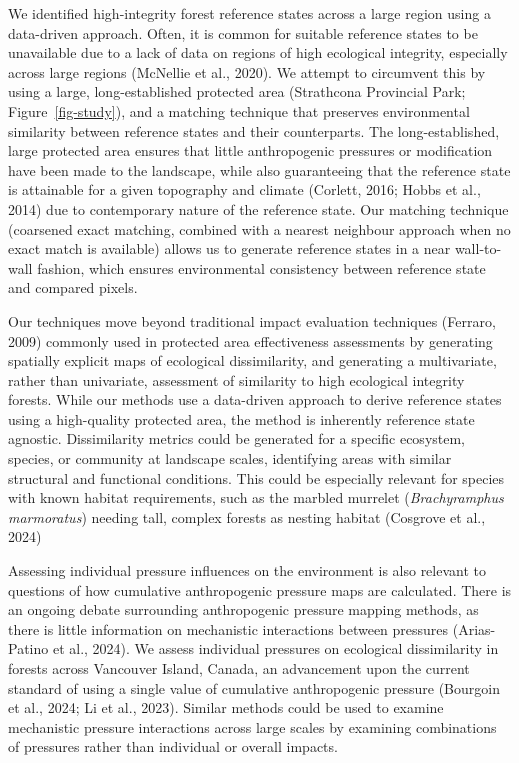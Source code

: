 \documentclass[
]{agujournal2019}
\begin{document}
We identified high-integrity forest reference states across a large
region using a data-driven approach. Often, it is common for suitable
reference states to be unavailable due to a lack of data on regions of
high ecological integrity, especially across large regions (McNellie et
al., 2020). We attempt to circumvent this by using a large,
long-established protected area (Strathcona Provincial Park;
Figure~\ref{fig-study}), and a matching technique that preserves
environmental similarity between reference states and their
counterparts. The long-established, large protected area ensures that
little anthropogenic pressures or modification have been made to the
landscape, while also guaranteeing that the reference state is
attainable for a given topography and climate (Corlett, 2016; Hobbs et
al., 2014) due to contemporary nature of the reference state. Our
matching technique (coarsened exact matching, combined with a nearest
neighbour approach when no exact match is available) allows us to
generate reference states in a near wall-to-wall fashion, which ensures
environmental consistency between reference state and compared pixels.

Our techniques move beyond traditional impact evaluation techniques
(Ferraro, 2009) commonly used in protected area effectiveness
assessments by generating spatially explicit maps of ecological
dissimilarity, and generating a multivariate, rather than univariate,
assessment of similarity to high ecological integrity forests. While our
methods use a data-driven approach to derive reference states using a
high-quality protected area, the method is inherently reference state
agnostic. Dissimilarity metrics could be generated for a specific
ecosystem, species, or community at landscape scales, identifying areas
with similar structural and functional conditions. This could be
especially relevant for species with known habitat requirements, such as
the marbled murrelet (\emph{Brachyramphus marmoratus}) needing tall,
complex forests as nesting habitat (Cosgrove et al., 2024)

Assessing individual pressure influences on the environment is also
relevant to questions of how cumulative anthropogenic pressure maps are
calculated. There is an ongoing debate surrounding anthropogenic
pressure mapping methods, as there is little information on mechanistic
interactions between pressures (Arias-Patino et al., 2024). We assess
individual pressures on ecological dissimilarity in forests across
Vancouver Island, Canada, an advancement upon the current standard of
using a single value of cumulative anthropogenic pressure (Bourgoin et
al., 2024; Li et al., 2023). Similar methods could be used to examine
mechanistic pressure interactions across large scales by examining
combinations of pressures rather than individual or overall impacts.
\end{document}
